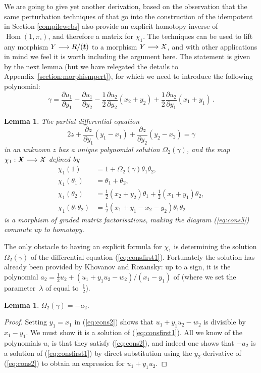 \documentclass{compositio}
\newtheorem{lemma}[theorem]{Lemma}
\theoremstyle{definition}
\numberwithin{equation}{section}
\def\Hom{\operatorname{Hom}}
\begin{document}
We are going to give yet another derivation, based on the observation that the same perturbation techniques of \cite{dm1102.2957} that go into the construction of the idempotent in Section \ref{compilewebs} also provide an explicit homotopy inverse of $\Hom(1,\pi_{\circ})$, and therefore a matrix for $\chi_1$. The techniques can be used to lift any morphism $Y \longrightarrow R/(\boldsymbol{t})$ to a morphism $Y \lto \Xcirc$, and with other applications in mind we feel it is worth including the argument here. The statement is given by the next lemma (but we have relegated the details to Appendix~\ref{section:morphismpert}), for which we need to introduce the following polynomial:
\[
\gamma = \frac{\partial u_1}{\partial y_1} - \frac{\partial u_1}{\partial y_2} - \frac{1}{2} \frac{\partial u_2}{\partial y_2}(x_2 + y_2) + \frac{1}{2} \frac{\partial u_2}{\partial y_1}(x_1 + y_1) \, .
\]
\begin{lemma}\label{lemma:consfirst} The partial differential equation 
\begin{equation}\label{eq:consfirst1}
2 z + \frac{\partial z}{\partial y_1} (y_1 - x_1) + \frac{\partial z}{\partial y_2}(y_2 - x_2) = \gamma
\end{equation}
in an unknown $z$ has a unique polynomial solution $\Omega_2(\gamma)$, and the map $\chi_1: \Xbul \lto \Xcirc$ defined by
\begin{align*}
\chi_1(1) &= 1 + \Omega_2( \gamma )\theta_1 \theta_2,\\
\chi_1(\theta_1) &= \theta_1 + \theta_2,\\
\chi_1(\theta_2) &= \frac{1}{2}(x_2 + y_2)\theta_1 + \frac{1}{2}(x_1 + y_1)\theta_2,\\
\chi_1(\theta_1\theta_2) &= \frac{1}{2}(x_1 + y_1 - x_2 - y_2) \theta_1\theta_2
\end{align*}
is a morphism of graded matrix factorisations, making the diagram (\ref{eq:cons5}) commute up to homotopy.
\end{lemma}

The only obstacle to having an explicit formula for $\chi_1$ is determining the solution $\Omega_2(\gamma)$ of the differential equation (\ref{eq:consfirst1}). Fortunately the solution has already been provided by Khovanov and Rozansky: up to a sign, it is the polynomial $a_2 = \frac{1}{2}u_2 + (u_1 + y_1 u_2 - w_2)/(x_1-y_1)$ of \cite[Section~6]{kr0401268} (where we set the parameter~$\lambda$ of \cite{kr0401268} equal to~$\frac{1}{2}$).

\begin{lemma} $\Omega_2(\gamma) = -a_2$.
\end{lemma}
\begin{proof}
Setting $y_1 = x_1$ in (\ref{eq:cons2}) shows that $u_1 + y_1 u_2 - w_2$ is divisible by $x_1 - y_1$. We must show it is a solution of (\ref{eq:consfirst1}). All we know of the polynomials $u_i$ is that they satisfy (\ref{eq:cons2}), and indeed one shows that $-a_2$ is a solution of (\ref{eq:consfirst1}) by direct substitution using the $y_2$-derivative of (\ref{eq:cons2}) to obtain an expression for $u_1 + y_1 u_2$.
\end{proof}
\end{document}
